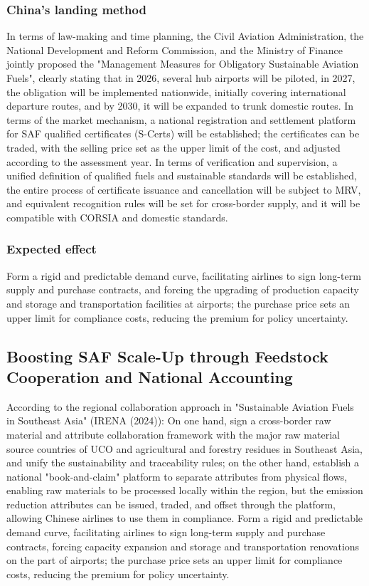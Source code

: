 \documentclass[a4paper,11pt]{article}
\begin{document}
\subsubsection{China's landing method}
In terms of law-making and time planning, the Civil Aviation Administration, the National Development and Reform Commission, and the Ministry of Finance jointly proposed the "Management Measures for Obligatory Sustainable Aviation Fuels", clearly stating that in 2026, several hub airports will be piloted, in 2027, the obligation will be implemented nationwide, initially covering international departure routes, and by 2030, it will be expanded to trunk domestic routes. In terms of the market mechanism, a national registration and settlement platform for SAF qualified certificates (S-Certs) will be established; the certificates can be traded, with the selling price set as the upper limit of the cost, and adjusted according to the assessment year. In terms of verification and supervision, a unified definition of qualified fuels and sustainable standards will be established, the entire process of certificate issuance and cancellation will be subject to MRV, and equivalent recognition rules will be set for cross-border supply, and it will be compatible with CORSIA and domestic standards.

\subsubsection{Expected effect}
Form a rigid and predictable demand curve, facilitating airlines to sign long-term supply and purchase contracts, and forcing the upgrading of production capacity and storage and transportation facilities at airports; the purchase price sets an upper limit for compliance costs, reducing the premium for policy uncertainty.

\subsection{Boosting SAF Scale-Up through Feedstock Cooperation and National Accounting}
According to the regional collaboration approach in "Sustainable Aviation Fuels in Southeast Asia" (IRENA (2024)): On one hand, sign a cross-border raw material and attribute collaboration framework with the major raw material source countries of UCO and agricultural and forestry residues in Southeast Asia, and unify the sustainability and traceability rules; on the other hand, establish a national "book-and-claim" platform to separate attributes from physical flows, enabling raw materials to be processed locally within the region, but the emission reduction attributes can be issued, traded, and offset through the platform, allowing Chinese airlines to use them in compliance. Form a rigid and predictable demand curve, facilitating airlines to sign long-term supply and purchase contracts, forcing capacity expansion and storage and transportation renovations on the part of airports; the purchase price sets an upper limit for compliance costs, reducing the premium for policy uncertainty.
\end{document}
